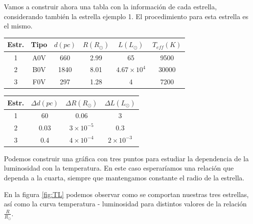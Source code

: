 \documentclass{aa} %
\begin{document}
Vamos a construir ahora una tabla con la información de cada estrella, considerando también la estrella ejemplo 1. El procedimiento para esta estrella es el mismo.

\begin{center}
\begin{tabular}{cccccc}
\hline \hline
Estr. & Tipo &  $d(pc)$ & $R(R_{\odot})$ & $L(L_{\odot})$ & $T_{eff} (K)$ \\ \hline
1 & A0V & 660 & 2.99 & 65 & 9500 \\
2 & B0V & 1840 & 8.01 & $4.67 \times 10^4$ & 30000 \\
3 & F0V & 297 & 1.28 & 4 & 7200 \\ \hline \hline
\end{tabular}
\label{tab:magnitudes}
\end{center}

\begin{center}
\begin{tabular}{cccc}
\hline \hline
Estr. & $\Delta d(pc)$ & $\Delta R(R_{\odot})$ & $\Delta L(L_{\odot})$ \\ \hline
1 & 60 & 0.06 & 3 \\
2 & 0.03 & $3 \times 10^{-5}$ & 0.3 \\
3 & 0.4 & $4 \times 10^{-4}$ & $2 \times 10^{-3}$ \\
\hline \hline
\end{tabular}
\label{tab:errores}
\end{center}

Podemos construir una gráfica con tres puntos para estudiar la dependencia de la luminosidad con la temperatura. En este caso esperaríamos una relación que dependa a la cuarta, siempre que mantengamos constante el radio de la estrella.

En la figura \ref{fig:TL} podemos observar como se comportan nuestras tres estrellas, así como la curva temperatura - luminosidad para distintos valores de la relación $\frac{R}{R_{\odot}}$.
\end{document}
